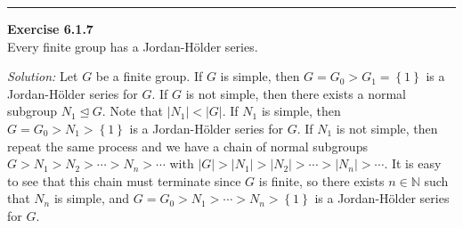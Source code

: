 \documentclass[a4paper, 12pt]{article}
\newenvironment{problem}[2][Exercise]
    { \begin{mdframed}[backgroundcolor=gray!20] \textbf{#1 #2} \\}
    {  \end{mdframed}}
\newenvironment{solution}
    {\textit{Solution:}}
    {}
\begin{document}
\noindent\rule{7in}{2.8pt}
\begin{problem}{6.1.7}
Every finite group has a Jordan-H\"{o}lder series.
\end{problem}
\begin{solution}
Let \(G\) be a finite group. If \(G\) is simple, then \(G=G_0>G_1=\left\{ 1 \right\}\) is a Jordan-H\"{o}lder series for \(G\). If \(G\) is not simple, then there exists a normal subgroup \(N_1\unlhd G\). Note that 
\(|N_1|<|G|\). If \(N_1\) is simple, then \(G=G_0>N_1>\left\{ 1 \right\}\) is a Jordan-H\"{o}lder series for \(G\). If \(N_1\) is not simple, then repeat the same process and we have a chain of normal subgroups \(G>N_1>N_2>\cdots>N_n>\cdots\) with 
\(|G|>|N_1|>|N_2|>\cdots>|N_n|>\cdots\). It is easy to see that this chain must terminate since \(G\) is finite, so there exists \(n\in \mathbb{N}\) such that \(N_n\) is simple, and \(G=G_0>N_1>\cdots>N_n>\left\{ 1 \right\}\) is a Jordan-H\"{o}lder series for \(G\).
\end{solution}
\end{document}
